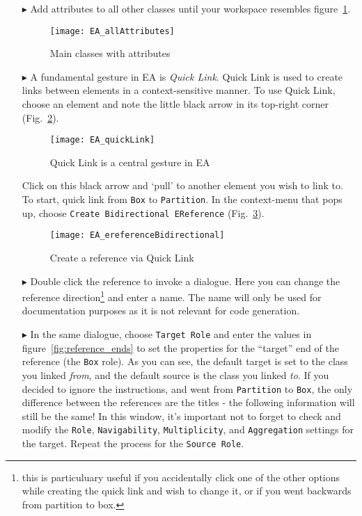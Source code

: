 \begin{itemize}
\pagebreak

\item[$\blacktriangleright$] Add attributes to all other classes until your workspace resembles figure~\ref{fig:attribute_completed}.

\begin{figure}[htbp]
	\centering
  \texttt{[image: EA\_allAttributes]}
	\caption{Main classes with attributes}
	\label{fig:attribute_completed}
\end{figure}
\FloatBarrier


\item[$\blacktriangleright$] A fundamental gesture in EA is \emph{Quick Link}.
Quick Link is used to create links between elements in a context-sensitive manner.
To use Quick Link, choose an element and note the little black arrow in its top-right corner (Fig.~\ref{fig:quicklink}).

\begin{figure}[htbp]
	\centering
  \texttt{[image: EA\_quickLink]}
	\caption{Quick Link is a central gesture in EA}
	\label{fig:quicklink}
\end{figure}
\FloatBarrier

\pagebreak

Click on this black arrow and `pull' to another element you wish to link to.
To start, quick link from \texttt{Box} to \texttt{Partition}.
In the context-menu that pops up, choose \texttt{Create Bidirectional EReference} (Fig.~\ref{fig:ereference}).

\begin{figure}[htbp]
	\centering
  \texttt{[image: EA\_ereferenceBidirectional]}
	\caption{Create a reference via Quick Link}
	\label{fig:ereference}
\end{figure}
\FloatBarrier

\item[$\blacktriangleright$] Double click the reference to invoke a dialogue.
Here you can change the reference direction\footnote{this is particuluary useful if you accidentally click one of the other options while creating the quick link and wish to change it, or if you went backwards from partition to box.} and enter a name. The name will only be used for documentation purposes as it is not relevant for code generation.

\item[$\blacktriangleright$] In the same dialogue, choose \texttt{Target Role} and enter the values in figure~\ref{fig:reference_ends} to set the properties for the ``target'' end of the reference (the \texttt{Box} role). As you can see, the default target is set to the class you linked \emph{from}, and the default source is the class you linked \emph{to}. If you decided to ignore the instructions, and went from \texttt{Partition} to \texttt{Box}, the only difference between the references are the titles - the following information will still be the same! In this window, it's important not to forget to check and modify the \texttt{Role}, \texttt{Navigability}, \texttt{Multiplicity}, and \texttt{Aggregation} settings for the target.  Repeat the process for the \texttt{Source Role}.


\end{itemize}
